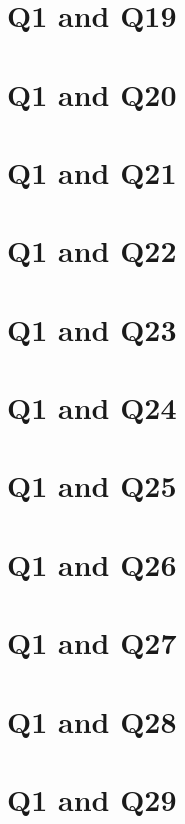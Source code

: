 \documentclass{report}
\begin{document}
\clearpage
\section{Q1 and Q19}


\clearpage
\section{Q1 and Q20}


\clearpage
\section{Q1 and Q21}


\clearpage
\section{Q1 and Q22}


\clearpage
\section{Q1 and Q23}


\clearpage
\section{Q1 and Q24}


\clearpage
\section{Q1 and Q25}


\clearpage
\section{Q1 and Q26}


\clearpage
\section{Q1 and Q27}


\clearpage
\section{Q1 and Q28}


\clearpage
\section{Q1 and Q29}

\end{document}
